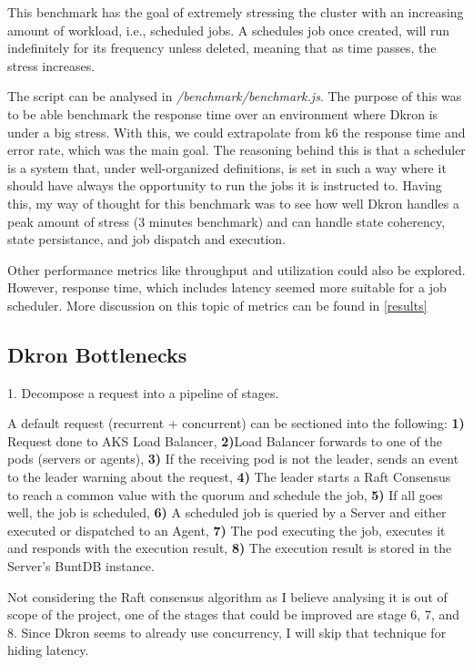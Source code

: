 \documentclass[runningheads]{llncs}
\begin{document}
This benchmark has the goal of extremely stressing the cluster with an increasing amount of
workload, i.e., scheduled jobs. A schedules job once created, will run indefinitely for its frequency
unless deleted, meaning that as time passes, the stress increases.

The script can be analysed in \textit{/benchmark/benchmark.js}.
The purpose of this was to be able benchmark the response time over an environment where Dkron
is under a big stress. With this, we could extrapolate from k6 the response time and error rate,
which was the main goal. The reasoning behind this is that a scheduler is a system that, under
well-organized definitions, is set in such a way where it should have always the opportunity to
run the jobs it is instructed to. Having this, my way of thought for this benchmark was to
see how well Dkron handles a peak amount of stress (3 minutes benchmark) and can handle
state coherency, state persistance, and job dispatch and execution.

Other performance metrics like throughput and utilization could also be explored.
However, response time, which includes latency seemed more suitable for a job scheduler.
More discussion on this topic of metrics can be found in \ref{results}


\subsection{Dkron Bottlenecks}
1. Decompose a request into a pipeline of stages.

A default request (recurrent + concurrent) can be sectioned into the following:
\textbf{1)} Request done to AKS Load Balancer,
\textbf{2)}Load Balancer forwards to one of the pods (servers or agents),
\textbf{3)} If the receiving pod is not the leader, sends an event to the leader warning about the request,
\textbf{4)} The leader starts a Raft Consensus to reach a common value with the quorum and schedule the job,
\textbf{5)} If all goes well, the job is scheduled,
\textbf{6)} A scheduled job is queried by a Server and either executed or dispatched to an Agent,
\textbf{7)} The pod executing the job, executes it and responds with the execution result,
\textbf{8)} The execution result is stored in the Server's BuntDB instance.

Not considering the Raft consensus algorithm as I believe analysing it is out of scope of the project,
one of the stages that could be improved are stage 6, 7, and 8.
Since Dkron seems to already use concurrency, I will skip that technique for hiding latency.
\end{document}
